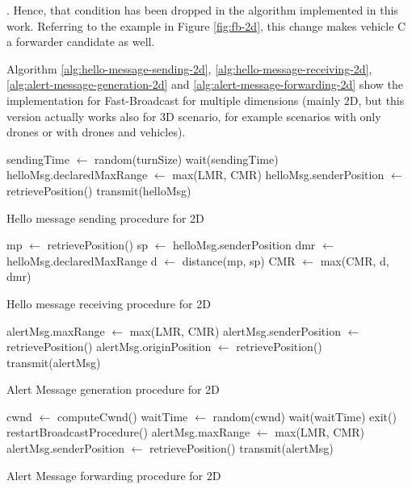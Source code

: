 		. Hence, that condition has been dropped in the algorithm implemented in this work. Referring to the example in Figure \ref{fig:fb-2d}, this change makes vehicle C a forwarder candidate as well.
		
		Algorithm \ref{alg:hello-message-sending-2d}, \ref{alg:hello-message-receiving-2d}, \ref{alg:alert-message-generation-2d} and \ref{alg:alert-message-forwarding-2d} show the implementation for Fast-Broadcast for multiple dimensions (mainly 2D, but this version actually works also for 3D scenario, for example scenarios with only drones or with drones and vehicles).
		
		\begin{algorithm}[H]
			\begin{algorithmic}[1]
				\State sendingTime $\gets$ random(turnSize)
				\State wait(sendingTime)
				\State helloMsg.declaredMaxRange $\gets$ max(LMR, CMR)
				\State helloMsg.senderPosition $\gets$ retrievePosition()
				\State transmit(helloMsg)
				\EndIf
				\EndFor
			\end{algorithmic}
			\caption{Hello message sending procedure for 2D}
			\label{alg:hello-message-sending-2d}
		\end{algorithm}
		
		\begin{algorithm}[H]
			\begin{algorithmic}[1]
				\State mp $\gets$ retrievePosition()
				\State sp $\gets$ helloMsg.senderPosition
				\State dmr $\gets$ helloMsg.declaredMaxRange
				\State d $\gets$ distance(mp, sp)
				\State CMR $\gets$ max(CMR, d, dmr)
			\end{algorithmic}
			\caption{Hello message receiving procedure for 2D}
			\label{alg:hello-message-receiving-2d}
		\end{algorithm}
	
	
		\begin{algorithm}[H]
			\begin{algorithmic}[1]
				\State alertMsg.maxRange $\gets$ max(LMR, CMR)
				\State alertMsg.senderPosition $\gets$ retrievePosition()
				\State alertMsg.originPosition $\gets$ retrievePosition()
				\State transmit(alertMsg)
			\end{algorithmic}
			\caption{Alert Message generation procedure for 2D}
			\label{alg:alert-message-generation-2d}
		\end{algorithm}
	
		\begin{algorithm}[H]
			\begin{algorithmic}[1]
				\State cwnd $\gets$ computeCwnd()
				\State waitTime $\gets$ random(cwnd)
				\State wait(waitTime)
				\State exit()
				\State restartBroadcastProcedure()
				\Else 
				\State alertMsg.maxRange $\gets$ max(LMR, CMR)
				\State alertMsg.senderPosition $\gets$ retrievePosition()
				\State transmit(alertMsg)
				\EndIf 
			\end{algorithmic}
			\caption{Alert Message forwarding procedure for 2D}
			\label{alg:alert-message-forwarding-2d}
		\end{algorithm}
	

